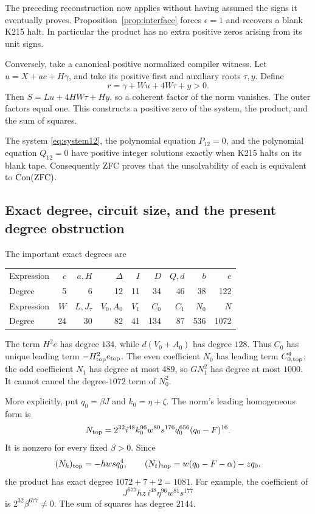 The preceding reconstruction now applies without having assumed the signs
it eventually proves. Proposition~\ref{prop:interface} forces $\epsilon=1$
and recovers a blank K215 halt. In particular the product has no extra
positive zeros arising from its unit signs.

Conversely, take a canonical positive normalized compiler witness. Let
$u=X+ac+H\gamma$, and take its positive first and auxiliary roots
$\tau,y$. Define
\[
 r=\gamma+Wu+4W\tau+y>0.
\]
Then $S=Lu+4HW\tau+Hy$, so a coherent factor of the norm vanishes.
The outer factors equal one. This constructs a positive zero of the system,
the product, and the sum of squares.

\begin{theorem}
The system \eqref{eq:system12}, the polynomial equation $P_{12}=0$, and
the polynomial equation $Q_{12}=0$ have positive integer solutions exactly
when K215 halts on its blank tape. Consequently ZFC proves that the
unsolvability of each is equivalent to $\operatorname{Con}(\mathrm{ZFC})$.
\end{theorem}

\subsection{Exact degree, circuit size, and the present degree obstruction}
The important exact degrees are
\begin{center}
\begin{tabular}{lrrrrrrrr}
\toprule
Expression & $c$ & $a,H$ & $\Delta$ & $I$ & $D$ & $Q,d$ & $b$ & $e$\\
Degree & 5 & 6 & 12 & 11 & 34 & 46 & 38 & 122\\
\midrule
Expression & $W$ & $L,J_\tau$ & $V_0,A_0$ & $V_1$ & $C_0$ & $C_1$ & $N_0$ & $N$\\
Degree & 24 & 30 & 82 & 41 & 134 & 87 & 536 & 1072\\
\bottomrule
\end{tabular}
\end{center}
The term $H^2e$ has degree $134$, while $d(V_0+A_0)$ has degree $128$.
Thus $C_0$ has unique leading term $-H_{\rm top}^2e_{\rm top}$. The even
coefficient $N_0$ has leading term $C_{0,\rm top}^4$; the odd coefficient
$N_1$ has degree at most $489$, so $GN_1^2$ has degree at most $1000$.
It cannot cancel the degree-$1072$ term of $N_0^2$.

More explicitly, put $q_0=\beta J$ and $k_0=\eta+\zeta$. The norm's
leading homogeneous form is
\begin{equation}
 N_{\rm top}=2^{32}i^{48}k_0^{96}w^{80}s^{176}
                 q_0^{656}(q_0-F)^{16}.\label{eq:leading12}
\end{equation}
It is nonzero for every fixed $\beta>0$. Since
\[
 (N_k)_{\rm top}=-hwsq_0^4,\qquad
 (N_t)_{\rm top}=w(q_0-F-\alpha)-zq_0,
\]
the product has exact degree $1072+7+2=1081$. For example, the coefficient
of
\[
 J^{677}hz\,i^{48}\eta^{96}w^{81}s^{177}
\]
is $2^{32}\beta^{677}\ne0$. The sum of squares has degree $2144$.

